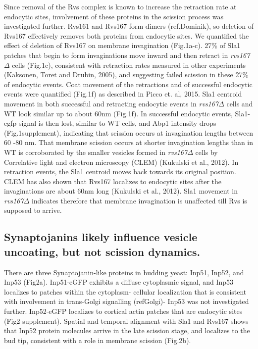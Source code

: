 \documentclass[9pt,lineno]{elife}
\begin{document}
Since removal of the Rvs complex is known to increase the retraction rate at endocytic sites, involvement of these proteins in the scission process was investigated further. Rvs161 and Rvs167 form dimers (ref.Dominik), so deletion of Rvs167 effectively removes both proteins from endocytic sites. We quantified the effect of deletion of Rvs167 on membrane invagination (Fig.1a-c). 27\% of Sla1 patches that begin to form invaginations move inward and then retract in \textit{rvs167$\Delta$} cells (Fig.1c), consistent with retraction rates measured in other experiments (Kaksonen, Toret and Drubin, 2005), and suggesting failed scission in these 27\% of endocytic events. Coat movement of the retractions and of successful endocytic events were quantified (Fig.1f) as described in Picco et. al, 2015. Sla1 centroid movement in both successful and retracting endocytic events in \textit{rvs167$\Delta$} cells and WT look similar up to about 60nm (Fig.1f).  In successful endocytic events, Sla1-egfp signal is then lost, similar to WT cells, and Abp1 intensity drops (Fig.1supplement), indicating that scission occurs at invagination lengths between 60 -80 nm. That membrane scission occurs at shorter invagination lengths than in WT is corroborated by the smaller vesicles formed in \textit{rvs167$\Delta$} cells by Correlative light and electron microscopy (CLEM) (Kukulski et al., 2012). In retraction events, the Sla1 centroid moves back towards its original position. CLEM has also shown that Rvs167 localizes to endocytic sites after the invaginations are about 60nm long (Kukulski et al., 2012). Sla1 movement in \textit{rvs167$\Delta$}  indicates therefore that membrane invagination is unaffected till Rvs is supposed to arrive. 




\subsection{Synaptojanins likely influence vesicle uncoating, but not scission dynamics.}

There are three Synaptojanin-like proteins in budding yeast: Inp51, Inp52, and Inp53 (Fig2a). Inp51-eGFP exhibits a diffuse cytoplasmic signal, and Inp53 localizes to patches within the cytoplasm- cellular localization that is consistent with involvement in trans-Golgi signalling (refGolgi)- Inp53 was not investigated further. Inp52-eGFP localizes to cortical actin patches that are endocytic sites (Fig2 supplement). Spatial and temporal alignment with Sla1 and Rvs167 shows that Inp52 protein molecules arrive in the late scission stage, and localizes to the bud tip, consistent with a role in membrane scission (Fig.2b). 
\end{document}
